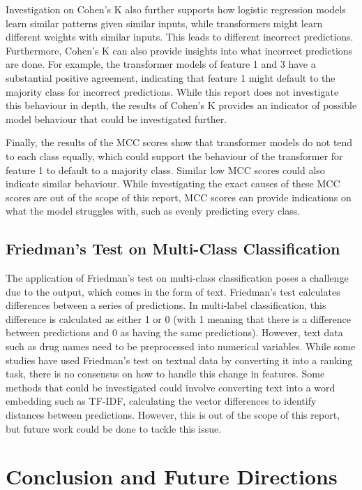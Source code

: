\documentclass[10.7pt, onecolumn]{article}
\begin{document}
Investigation on Cohen's K also further supports how logistic regression models learn similar patterns given similar inputs, while transformers might learn different weights with similar inputs. This leads to different incorrect predictions. Furthermore, Cohen's K can also provide insights into what incorrect predictions are done. For example, the transformer models of feature 1 and 3 have a substantial positive agreement, indicating that feature 1 might default to the majority class for incorrect predictions. While this report does not investigate this behaviour in depth, the results of Cohen's K provides an indicator of possible model behaviour that could be investigated further.

Finally, the results of the MCC scores show that transformer models do not tend to each class equally, which could support the behaviour of the transformer for feature 1 to default to a majority class. Similar low MCC scores could also indicate similar behaviour. While investigating the exact causes of these MCC scores are out of the scope of this report, MCC scores can provide indications on what the model struggles with, such as evenly predicting every class.

\subsection{Friedman's Test on Multi-Class Classification}

The application of Friedman's test on multi-class classification poses a challenge due to the output, which comes in the form of text. Friedman's test calculates differences between a series of predictions. In multi-label classification, this difference is calculated as either 1 or 0 (with 1 meaning that there is a difference between predictions and 0 as having the same predictions). However, text data such as drug names need to be preprocessed into numerical variables. While some studies have used Friedman's test on textual data by converting it into a ranking task\cite{article1}, there is no consensus on how to handle this change in features. Some methods that could be investigated could involve converting text into a word embedding such as TF-IDF, calculating the vector differences to identify distances between predictions. However, this is out of the scope of this report, but future work could be done to tackle this issue.

\section{Conclusion and Future Directions}
\end{document}
